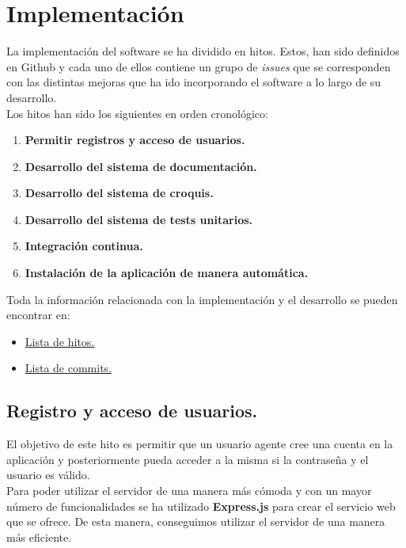 \chapter{Implementación}

La implementación del software se ha dividido en hitos. Estos, han sido definidos en Github
y cada uno de ellos contiene un grupo de \textit{issues} que se corresponden con las distintas
mejoras que ha ido incorporando el software a lo largo de su desarrollo.\\

Los hitos han sido los siguientes en orden cronológico:

\begin{enumerate}
	\item \textbf{Permitir registros y acceso de usuarios.}
	\item \textbf{Desarrollo del sistema de documentación.}
	\item \textbf{Desarrollo del sistema de croquis.}
	\item \textbf{Desarrollo del sistema de tests unitarios.}
	\item \textbf{Integración continua.}
	\item \textbf{Instalación de la aplicación de manera automática.}
\end{enumerate}

Toda la información relacionada con la implementación y el desarrollo se pueden encontrar en:

\begin{itemize}
	\item \href{https://github.com/Cerv1/Chief/milestones}{Lista de hitos.}
	\item \href{https://github.com/Cerv1/Chief/commits}{Lista de commits.}
\end{itemize}

\newpage

\section{Registro y acceso de usuarios.}
El objetivo de este hito es permitir que un usuario agente cree una cuenta en la aplicación 
y posteriormente pueda acceder a la misma si la contraseña y el usuario es válido. \\

Para poder utilizar el servidor de una manera más cómoda y con un mayor número de funcionalidades se ha utilizado
\textbf{Express.js}\cite{express} para crear el servicio web que se ofrece. De esta manera, conseguimos utilizar el 
servidor de una manera más eficiente.\\

